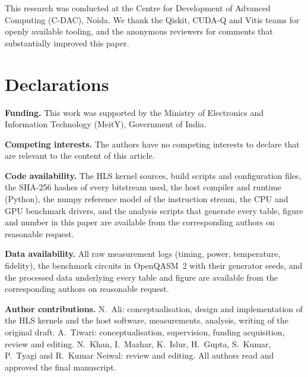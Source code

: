 \documentclass[pdflatex,sn-mathphys-num]{sn-jnl}
\theoremstyle{thmstyleone}
\theoremstyle{thmstylethree}
\begin{document}
\backmatter

This research was conducted at the Centre for Development of Advanced Computing (C-DAC), Noida. We thank the Qiskit, CUDA-Q and Vitis teams for openly available tooling, and the anonymous reviewers for comments that substantially improved this paper.

\section*{Declarations}

\textbf{Funding.} This work was supported by the Ministry of Electronics and Information Technology (MeitY), Government of India.

\textbf{Competing interests.} The authors have no competing interests to declare that are relevant to the content of this article.

\textbf{Code availability.} The HLS kernel sources, build scripts and configuration files, the SHA-256 hashes of every bitstream used, the host compiler and runtime (Python), the numpy reference model of the instruction stream, the CPU and GPU benchmark drivers, and the analysis scripts that generate every table, figure and number in this paper are available from the corresponding authors on reasonable request.

\textbf{Data availability.} All raw measurement logs (timing, power, temperature, fidelity), the benchmark circuits in OpenQASM~2 with their generator seeds, and the processed data underlying every table and figure are available from the corresponding authors on reasonable request.

\textbf{Author contributions.} N.~Ali: conceptualisation, design and implementation of the HLS kernels and the host software, measurements, analysis, writing of the original draft. A.~Tiwari: conceptualisation, supervision, funding acquisition, review and editing. N.~Khan, I.~Mazhar, K.~Islur, H.~Gupta, S.~Kumar, P.~Tyagi and R.~Kumar Neiwal: review and editing. All authors read and approved the final manuscript.
\end{document}
